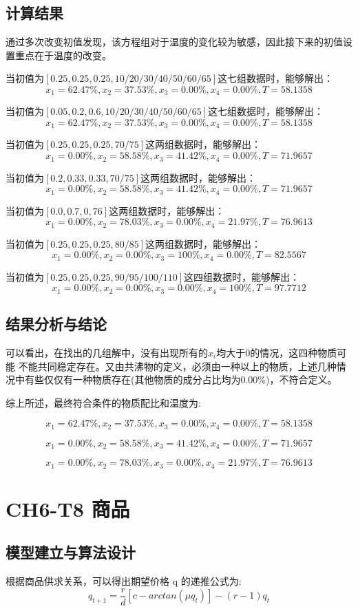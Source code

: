 \documentclass{article}
\begin{document}
\subsection{计算结果}
通过多次改变初值发现，该方程组对于温度的变化较为敏感，因此接下来的初值设置重点在于温度的改变。

当初值为$[0.25,0.25,0.25,10/20/30/40/50/60/65]$这七组数据时，能够解出：
$$x_1=62.47\%,x_2=37.53\%,x_3=0.00\%,x_4=0.00\%,T=58.1358$$

当初值为$[0.05,0.2,0.6,10/20/30/40/50/60/65]$这七组数据时，能够解出：
$$x_1=62.47\%,x_2=37.53\%,x_3=0.00\%,x_4=0.00\%,T=58.1358$$

当初值为$[0.25,0.25,0.25,70/75]$这两组数据时，能够解出：
$$x_1=0.00\%,x_2=58.58\%,x_3=41.42\%,x_4=0.00\%,T=71.9657$$

当初值为$[0.2,0.33,0.33,70/75]$这两组数据时，能够解出：
$$x_1=0.00\%,x_2=58.58\%,x_3=41.42\%,x_4=0.00\%,T=71.9657$$

当初值为$[0.0,0.7,0,76]$这两组数据时，能够解出：
$$x_1=0.00\%,x_2=78.03\%,x_3=0.00\%,x_4=21.97\%,T=76.9613$$

当初值为$[0.25,0.25,0.25,80/85]$这两组数据时，能够解出：
$$x_1=0.00\%,x_2=0.00\%,x_3=100\%,x_4=0.00\%,T=82.5567$$

当初值为$[0.25,0.25,0.25,90/95/100/110]$这四组数据时，能够解出：
$$x_1=0.00\%,x_2=0.00\%,x_3=0.00\%,x_4=100\%,T=97.7712$$

\subsection{结果分析与结论}

可以看出，在找出的几组解中，没有出现所有的$x_i$均大于0的情况，这四种物质可能 不能共同稳定存在。又由共沸物的定义，必须由一种以上的物质，上述几种情况中有些仅仅有一种物质存在(其他物质的成分占比均为0.00\%)，不符合定义。

综上所述，最终符合条件的物质配比和温度为:

$$x_1=62.47\%,x_2=37.53\%,x_3=0.00\%,x_4=0.00\%,T=58.1358$$

$$x_1=0.00\%,x_2=58.58\%,x_3=41.42\%,x_4=0.00\%,T=71.9657$$

$$x_1=0.00\%,x_2=78.03\%,x_3=0.00\%,x_4=21.97\%,T=76.9613$$

\section{CH6-T8 商品}
\subsection{模型建立与算法设计}
根据商品供求关系，可以得出期望价格 q 的递推公式为:
$$q_{t+1} = \frac{r}{d}[c-arctan(\mu q_t)]-(r-1)q_t$$
\end{document}
